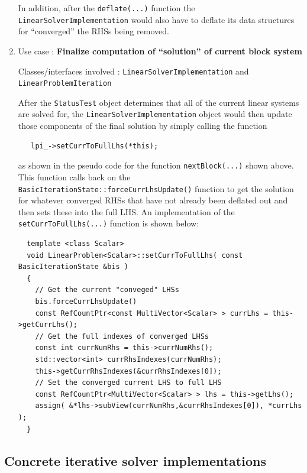 \documentclass[pdf,ps2pdf,11pt]{SANDreport}
\begin{document}
\begin{enumerate}
In addition, after the {}\texttt{deflate(...)} function the
{}\texttt{Linear\-Solver\-Implementation} would also have to deflate
its data structures for ``converged'' the RHSs being removed.

{}\item Use case : \textbf{Finalize computation of ``solution'' of
current block system}

{}\noindent{}Classes/interfaces involved :
{}\texttt{Linear\-Solver\-Implementation} and
{}\texttt{Linear\-Problem\-Iteration}

After the {}\texttt{Status\-Test} object determines that all of the
current linear systems are solved for, the
{}\texttt{Linear\-Solver\-Implementation} object would then update
those components of the final solution by simply calling the function

{\scriptsize\begin{verbatim}
   lpi_->setCurrToFullLhs(*this);
\end{verbatim}}

{}\noindent{}as shown in the pseudo code for the function
{}\texttt{nextBlock(...)} shown above.  This function calls back on
the {}\texttt{Basic\-Iteration\-State\-::force\-Curr\-Lhs\-Update()}
function to get the solution for whatever converged RHSs that have not
already been deflated out and then sets these into the full LHS.  An
implementation of the {}\texttt{set\-Curr\-To\-Full\-Lhs(...)} 
function is shown below:

{\scriptsize\begin{verbatim}
  template <class Scalar>
  void LinearProblem<Scalar>::setCurrToFullLhs( const BasicIterationState &bis )
  {
    // Get the current "conveged" LHSs
    bis.forceCurrLhsUpdate()
    const RefCountPtr<const MultiVector<Scalar> > currLhs = this->getCurrLhs();
    // Get the full indexes of converged LHSs
    const int currNumRhs = this->currNumRhs();
    std::vector<int> currRhsIndexes(currNumRhs);
    this->getCurrRhsIndexes(&currRhsIndexes[0]);
    // Set the converged current LHS to full LHS
    const RefCountPtr<MultiVector<Scalar> > lhs = this->getLhs();
    assign( &*lhs->subView(currNumRhs,&currRhsIndexes[0]), *currLhs );
  }
\end{verbatim}}

\end{enumerate}

\subsection{Concrete iterative solver implementations}
\end{document}
